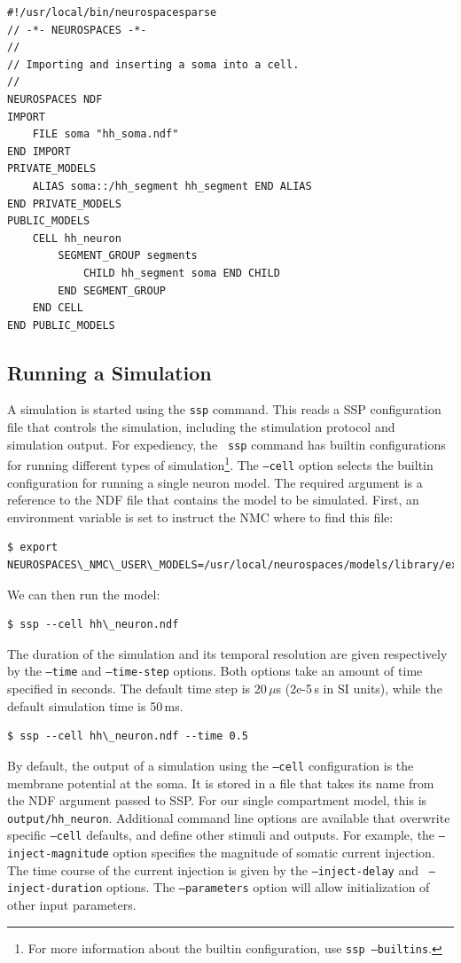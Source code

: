 \documentclass[12pt]{article}
\begin{document}
\begin{verbatim}
#!/usr/local/bin/neurospacesparse
// -*- NEUROSPACES -*-
//
// Importing and inserting a soma into a cell.
//
NEUROSPACES NDF
IMPORT
    FILE soma "hh_soma.ndf"
END IMPORT
PRIVATE_MODELS
    ALIAS soma::/hh_segment hh_segment END ALIAS
END PRIVATE_MODELS
PUBLIC_MODELS
    CELL hh_neuron
        SEGMENT_GROUP segments
            CHILD hh_segment soma END CHILD
        END SEGMENT_GROUP
    END CELL
END PUBLIC_MODELS
\end{verbatim}

\subsection{Running a Simulation}
\label{sec:running-simulation}

A simulation is started using the {\tt ssp} command.  This reads a SSP
configuration file that controls the simulation, including the
stimulation protocol and simulation output.  For expediency, the {\tt
  ssp} command has builtin configurations for running different types
of simulation\footnote{For more information about the builtin
  configuration, use {\tt ssp --builtins}.}.  The {\tt --cell}
option selects the builtin configuration for running a single neuron
model.  The required argument is a reference to the NDF file that
contains the model to be simulated.  First, an environment variable is
set to instruct the NMC where to find this file:

\begin{verbatim}
$ export NEUROSPACES\_NMC\_USER\_MODELS=/usr/local/neurospaces/models/library/examples
\end{verbatim}
We can then run the model:
\begin{verbatim}
$ ssp --cell hh\_neuron.ndf
\end{verbatim}

The duration of the simulation and its temporal resolution are given
respectively by the {\tt --time} and {\tt --time-step} options.  Both
options take an amount of time specified in seconds.  The default time
step is 20$\,\mu$s (2e-5$\,$s in SI units), while the default
simulation time is 50$\,$ms.

\begin{verbatim}
$ ssp --cell hh\_neuron.ndf --time 0.5
\end{verbatim}

By default, the output of a simulation using the {\tt --cell}
configuration is the membrane potential at the soma.  It is stored in
a file that takes its name from the NDF argument passed to SSP.  For
our single compartment model, this is {\tt output/hh\_neuron}.
Additional command line options are available that overwrite specific
{\tt --cell} defaults, and define other stimuli and outputs.  For
example, the {\tt --inject-magnitude} option specifies the magnitude
of somatic current injection.  The time course of the current
injection is given by the {\tt --inject-delay} and {\tt
  --inject-duration} options.  The {\tt --parameters} option will
allow initialization of other input parameters.
\end{document}
